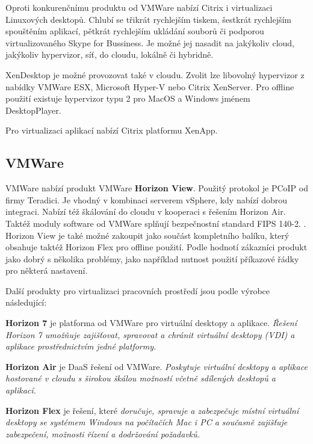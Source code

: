 Oproti konkurenčnímu produktu od VMWare nabízí Citrix i virtualizaci Linuxových desktopů. Chlubí se třikrát rychlejším tiskem, šestkrát rychlejším spouštěním aplikací, pětkrát rychlejším ukládání souborů či podporou virtualizovaného Skype for Bussiness. Je možné jej nasadit na jakýkoliv cloud, jakýkoliv hypervizor, síť, do cloudu, lokálně či hybridně. 

XenDesktop je možné provozovat také v cloudu. Zvolit lze libovolný hypervizor z nabídky VMWare ESX, Microsoft Hyper-V nebo Citrix XenServer. Pro offline použití existuje hypervizor typu 2 pro MacOS a Windows jménem DesktopPlayer. 

Pro virtualizaci aplikací nabízí Citrix platformu XenApp.


\subsection{VMWare}
VMWare nabízí produkt VMWare \textbf{Horizon View}. Použitý protokol je PCoIP od firmy Teradici. Je vhodný v kombinaci serverem vSphere, kdy nabízí dobrou integraci. Nabízí též škálování do cloudu v kooperaci s řešením Horizon Air. Taktéž moduly software od VMWare splňují bezpečnostní standard FIPS 140-2. . Horizon View je také možné zakoupit jako součást kompletního balíku, který obsahuje taktéž Horizon Flex pro offline použití. Podle  hodnotí zákazníci produkt jako dobrý s několika problémy, jako například nutnost použití příkazové řádky pro některá nastavení.

Další produkty pro virtualizaci pracovních prostředí jsou podle výrobce  následující:


\textbf{Horizon 7} je platforma od VMWare pro virtuální desktopy a aplikace. \textit{Řešení Horizon 7 umožňuje zajišťovat, spravovat a chránit virtuální desktopy (VDI) a aplikace prostřednictvím jedné platformy.}

\textbf{Horizon Air} je DaaS řešení od VMWare. \textit{Poskytuje virtuální desktopy a aplikace hostované v cloudu s širokou škálou možností včetně sdílených desktopů a aplikací.}

\textbf{Horizon Flex} je řešení, které \textit{doručuje, spravuje a zabezpečuje místní virtuální desktopy se systémem Windows na počítačích Mac i PC a současně zajišťuje zabezpečení, možnosti řízení a dodržování požadavků.}

